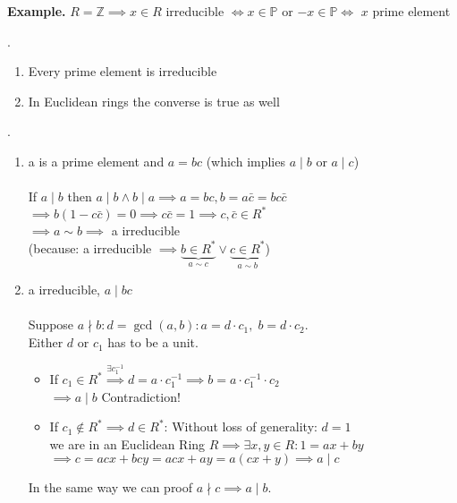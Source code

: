 \textbf{Example.}
$R = \mathbb{Z} \implies x \in R$ irreducible $\iff x \in \mathbb{P}$ or $-x \in \mathbb{P} \iff $ $x$ prime element

\Theorem.
\begin{enumerate}
  \item Every prime element is irreducible
  \item In Euclidean rings the converse is true as well
\end{enumerate}

\Proof.
\begin{enumerate}

  \item a is a prime element and $a = bc$ (which implies $a∣b$ or $a∣c$)\\\\
  If $a∣b$ then $a∣b \land b∣a \implies a = bc, b = a\bar{c} = b c\bar{c}$\\
  $\implies b(1-c\bar{c}) = 0 \implies c\bar{c} = 1 \implies c, \bar{c} \in R^{*}$\\
  $\implies a \sim b \implies$ a irreducible\\
  (because: a irreducible $\implies \underbrace{b \in R^{*}}_{a \sim c} \lor \underbrace{c \in R^{*}}_{a \sim b}$)

  \item a irreducible, $a∣bc$\\\\
  Suppose $a \nmid b: d = \gcd(a,b): a = d\cdot c_1,\; b = d\cdot c_2$.\\
  Either $d$ or $c_1$ has to be a unit.
  \begin{itemize}
    \item If $c_1 \in R^{*} \stackrel{\exists c_1^{-1}}{\implies} d = a\cdot c_1^{-1} \implies b = a \cdot c_1^{-1} \cdot c_2$\\
    $\implies a ∣b$ Contradiction!

    \item If $c_1 \not\in R^{*} \implies d \in R^{*}$:
    Without loss of generality: $d = 1$\\
    we are in an Euclidean Ring $R \implies \exists x,y \in R: 1 = ax + by$\\
    $\implies c = acx + bcy = acx + ay = a (cx+y) \implies a∣c$

  \end{itemize}
  In the same way we can proof $a \nmid c \implies a∣b$.

\end{enumerate}

